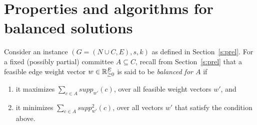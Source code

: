 \section{Properties and algorithms for balanced solutions} \label{s:balanced}

Consider an instance $(G=(N\cup C, E), s, k)$ as defined in Section~\ref{s:prel}. 
For a fixed (possibly partial) committee $A\subseteq C$, recall from Section~\ref{s:prel} that a feasible edge weight vector $w\in\mathbb{R}_{\geq 0}^E$ is said to be \emph{balanced for $A$} if %
%
\begin{enumerate}
    \item it maximizes $\sum_{c\in A} supp_{w'}(c)$, over all feasible weight vectors $w'$, and \label{balanced1}
    \item it minimizes $\sum_{c\in A} supp_{w'}^2(c)$, over all vectors $w'$ that satisfy the condition above. \label{balanced2}
\end{enumerate}


